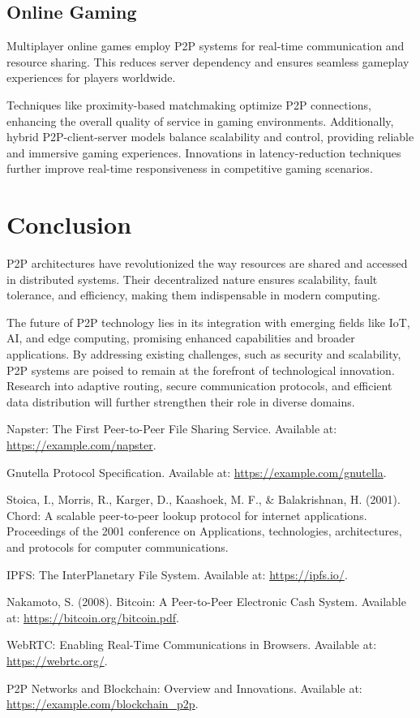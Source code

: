 \documentclass[12pt]{article}
\begin{document}
\subsection{Online Gaming}
Multiplayer online games employ P2P systems for real-time communication and resource sharing. This reduces server dependency and ensures seamless gameplay experiences for players worldwide.

Techniques like proximity-based matchmaking optimize P2P connections, enhancing the overall quality of service in gaming environments. Additionally, hybrid P2P-client-server models balance scalability and control, providing reliable and immersive gaming experiences. Innovations in latency-reduction techniques further improve real-time responsiveness in competitive gaming scenarios.

\section{Conclusion}
P2P architectures have revolutionized the way resources are shared and accessed in distributed systems. Their decentralized nature ensures scalability, fault tolerance, and efficiency, making them indispensable in modern computing.

The future of P2P technology lies in its integration with emerging fields like IoT, AI, and edge computing, promising enhanced capabilities and broader applications. By addressing existing challenges, such as security and scalability, P2P systems are poised to remain at the forefront of technological innovation. Research into adaptive routing, secure communication protocols, and efficient data distribution will further strengthen their role in diverse domains.

\newpage
\begin{thebibliography}{99}

 Napster: The First Peer-to-Peer File Sharing Service. Available at: \url{https://example.com/napster}.

 Gnutella Protocol Specification. Available at: \url{https://example.com/gnutella}.

 Stoica, I., Morris, R., Karger, D., Kaashoek, M. F., \& Balakrishnan, H. (2001). Chord: A scalable peer-to-peer lookup protocol for internet applications. Proceedings of the 2001 conference on Applications, technologies, architectures, and protocols for computer communications.

 IPFS: The InterPlanetary File System. Available at: \url{https://ipfs.io/}.

 Nakamoto, S. (2008). Bitcoin: A Peer-to-Peer Electronic Cash System. Available at: \url{https://bitcoin.org/bitcoin.pdf}.

 WebRTC: Enabling Real-Time Communications in Browsers. Available at: \url{https://webrtc.org/}.

 P2P Networks and Blockchain: Overview and Innovations. Available at: \url{https://example.com/blockchain_p2p}.

\end{thebibliography}
\end{document}
